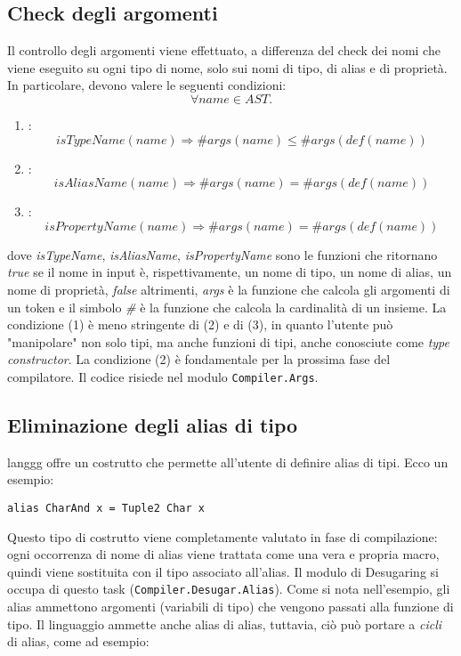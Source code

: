 \documentclass[10pt,a4paper]{article}
\begin{document}
\subsection{Check degli argomenti}
Il controllo degli argomenti viene effettuato, a differenza del check dei nomi che viene eseguito su ogni tipo di nome,
solo sui nomi di tipo, di alias e di proprietà. In particolare, devono valere le seguenti condizioni:
\[ \forall name \in AST. \]
\begin{enumerate}
    \item:
        \[ isTypeName(name) \Longrightarrow \# args(name) \leq \#args(def(name)) \]
    \item:
        \[ isAliasName(name) \Longrightarrow \#args(name) = \#args(def(name)) \]
    \item:
        \[ isPropertyName(name) \Longrightarrow \#args(name) = \#args(def(name)) \]
\end{enumerate}
dove \textit{isTypeName}, \textit{isAliasName}, \textit{isPropertyName} sono le funzioni che ritornano \textit{true}
se il nome in input è, rispettivamente, un nome di tipo, un nome di alias, un nome di proprietà, \textit{false} altrimenti,
\textit{args} è la funzione che calcola gli argomenti di un token e il simbolo \textit{\#} è la funzione che calcola
la cardinalità di un insieme. La condizione (1) è meno stringente di (2) e di (3),
in quanto l'utente può "manipolare" non solo tipi, ma anche funzioni di tipi,
anche conosciute come \textit{type constructor}. La condizione (2) è fondamentale per la prossima fase del compilatore.
Il codice risiede nel modulo \texttt{Compiler.Args}.

\subsection{Eliminazione degli alias di tipo}
langgg offre un costrutto che permette all'utente di definire alias di tipi. Ecco un esempio:

\begin{lstlisting}
alias CharAnd x = Tuple2 Char x
\end{lstlisting}

Questo tipo di costrutto viene completamente valutato in fase di compilazione: ogni occorrenza di nome di alias viene
trattata come una vera e propria macro, quindi viene sostituita con il tipo associato all'alias. Il modulo di Desugaring
si occupa di questo task (\texttt{Compiler.Desugar.Alias}).
Come si nota nell'esempio, gli alias ammettono argomenti (variabili di tipo) che vengono passati alla funzione di tipo.
Il linguaggio ammette anche alias di alias, tuttavia, ciò può portare a \textit{cicli} di alias, come ad esempio:
\end{document}
